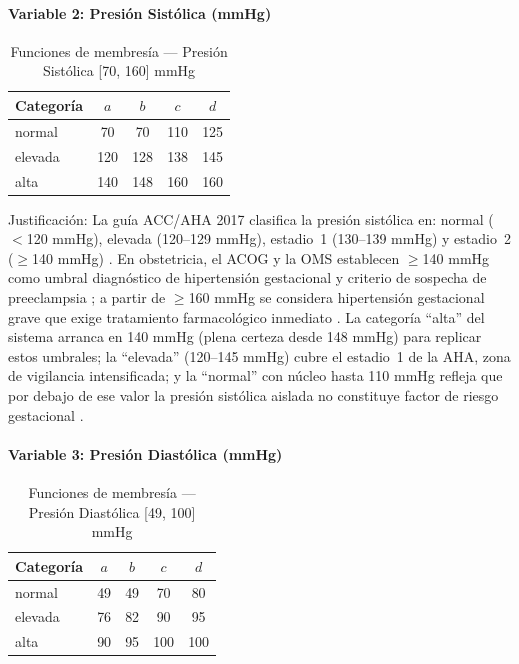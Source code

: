 \documentclass[11pt]{article}
\begin{document}
\paragraph{Variable 2: Presión Sistólica (mmHg)}

\begin{table}[H]
    \centering
    \caption{Funciones de membres\'ia --- Presi\'on Sist\'olica [70, 160] mmHg}
    \begin{tabular}{lcccc}
        \toprule
        \textbf{Categoría} & $a$ & $b$ & $c$ & $d$ \\
        \midrule
        normal             & 70  & 70  & 110 & 125 \\
        elevada            & 120 & 128 & 138 & 145 \\
        alta               & 140 & 148 & 160 & 160 \\
        \bottomrule
    \end{tabular}
    \par{}
\end{table}

Justificaci\'on: La gu\'ia ACC/AHA 2017 clasifica la presi\'on sist\'olica en: normal ($<$120 mmHg), elevada (120--129 mmHg), estadio~1 (130--139 mmHg) y estadio~2 ($\geq$140 mmHg) \cite{whelton2018}. En obstetricia, el ACOG y la OMS establecen $\geq$140 mmHg como umbral diagn\'ostico de hipertensi\'on gestacional y criterio de sospecha de preeclampsia \cite{acog2020,who2011hypertension}; a partir de $\geq$160 mmHg se considera hipertensi\'on gestacional grave que exige tratamiento farmacol\'ogico inmediato \cite{acog2020}. La categor\'ia ``alta'' del sistema arranca en 140 mmHg (plena certeza desde 148 mmHg) para replicar estos umbrales; la ``elevada'' (120--145 mmHg) cubre el estadio~1 de la AHA, zona de vigilancia intensificada; y la ``normal'' con n\'ucleo hasta 110 mmHg refleja que por debajo de ese valor la presi\'on sist\'olica aislada no constituye factor de riesgo gestacional \cite{whelton2018}.

\paragraph{Variable 3: Presión Diastólica (mmHg)}

\begin{table}[H]
    \centering
    \caption{Funciones de membres\'ia --- Presi\'on Diast\'olica [49, 100] mmHg}
    \begin{tabular}{lcccc}
        \toprule
        \textbf{Categoría} & $a$ & $b$ & $c$ & $d$ \\
        \midrule
        normal             & 49  & 49  & 70  & 80  \\
        elevada            & 76  & 82  & 90  & 95  \\
        alta               & 90  & 95  & 100 & 100 \\
        \bottomrule
    \end{tabular}
    \par{}
\end{table}
\end{document}
